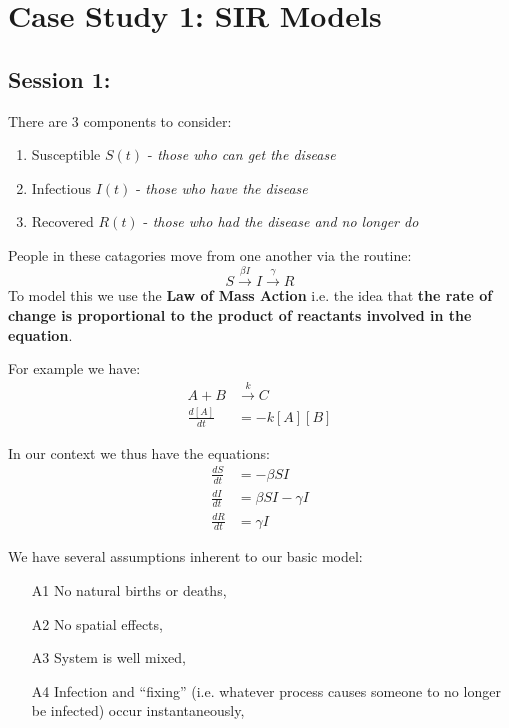 \documentclass[a4paper,openany,nobib]{tufte-book}
\begin{document}
\thispagestyle{empty}
\chapter{Case Study 1: SIR Models} 
\setcounter{page}{1}
\section{Session 1:}%
\label{sec:Session 1:}

There are 3 components to consider:
\begin{enumerate}
	\item Susceptible $S(t)$ - \textit{those who can get the disease}
	\item Infectious $I(t)$ - \textit{those who have the disease}
	\item Recovered $R(t)$ - \textit{those who had the disease and no longer do}
\end{enumerate}
People in these catagories move from one another via the routine:
\begin{equation*}
	S \xrightarrow{\beta I} I  \xrightarrow{\gamma} R
\end{equation*}
To model this we use the \textbf{Law of Mass Action} i.e. the idea that \textbf{the rate of change is proportional to the product of reactants involved in the equation}.

For example we have:
\begin{align*}
	A+ B &\xrightarrow{k} C\\
	\frac{d[A]}{dt} &= -k \left[ A \right]\left[ B \right] 
\end{align*}

In our context we thus have the equations:
\begin{align}
	  \label{eq:eqn1}
	\frac{dS}{dt} &=  - \beta SI\\ 
	  \label{eq:eqn2} 
	\frac{dI}{dt} &= \beta S I - \gamma I\\
	  \label{eq:eqn3}
	\frac{dR}{dt} &= \gamma I
\end{align}

We have several assumptions inherent to our basic model:
\begin{enumerate}
	\item[A1] No natural births or deaths,
	\item[A2] No spatial effects,
	\item[A3] System is well mixed,
	\item[A4] Infection and ``fixing'' (i.e. whatever process causes someone to no longer be infected) occur instantaneously,
\end{enumerate}
\end{document}
